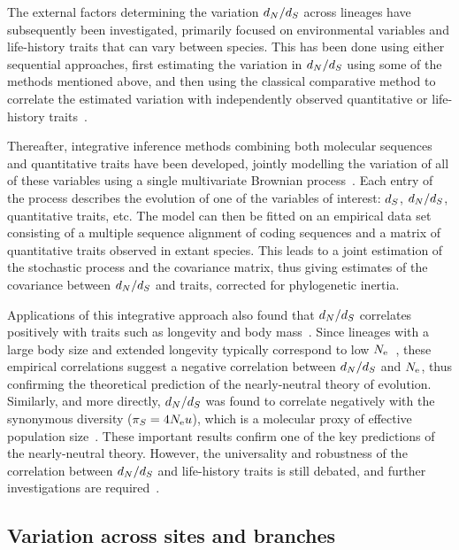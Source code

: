 The external factors determining the variation $d_N / d_S$ across lineages have subsequently been investigated, primarily focused on environmental variables and life-history traits that can vary between species.
This has been done using either sequential approaches, first estimating the variation in $d_N / d_S$ using some of the methods mentioned above, and then using the classical comparative method to correlate the estimated variation with independently observed quantitative or life-history traits~\citep{Popadin2007, Lanfear2010, Romiguier2014}.

Thereafter, integrative inference methods combining both molecular sequences and quantitative traits have been developed, jointly modelling the variation of all of these variables using a single multivariate Brownian process~\citep{Lartillot2011}.
Each entry of the process describes the evolution of one of the variables of interest: $d_S$, $d_N / d_S$, quantitative traits, etc.
The model can then be fitted on an empirical data set consisting of a multiple sequence alignment of coding sequences and a matrix of quantitative traits observed in extant species.
This leads to a joint estimation of the stochastic process and the covariance matrix, thus giving estimates of the covariance between $d_N / d_S$ and traits, corrected for phylogenetic inertia.

Applications of this integrative approach also found that $d_N / d_S$ correlates positively with traits such as longevity and body mass~\citep{Lartillot2011, Figuet2017}.
Since lineages with a large body size and extended longevity typically correspond to low $N_{\textrm{e}}$~\citep{Romiguier2014}, these empirical correlations suggest a negative correlation between $d_N / d_S$ and $N_{\textrm{e}}$, thus confirming the theoretical prediction of the nearly-neutral theory of evolution.
Similarly, and more directly, $d_N / d_S$ was found to correlate negatively with the synonymous diversity ($\pi_S = 4 N_{\textrm{e}} u$), which is a molecular proxy of effective population size~\citep{Brevet2019}.
These important results confirm one of the key predictions of the nearly-neutral theory.
However, the universality and robustness of the correlation between $d_N / d_S$ and life-history traits is still debated, and further investigations are required~\citep{Nabholz2013,Lanfear2014,Figuet2016, Bolivar2019}.

\subsection{Variation across sites and branches}
\label{subsec:variation-across-sites-and-branches}

